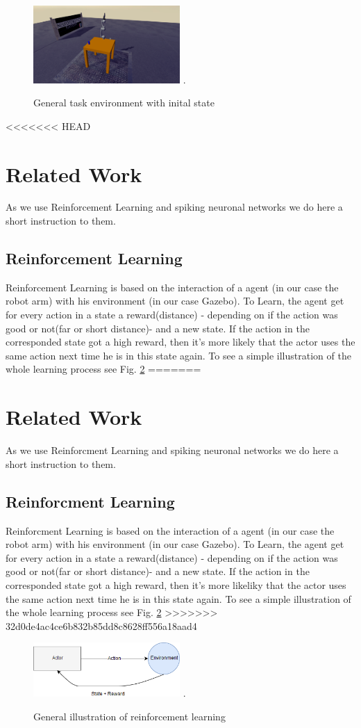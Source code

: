\begin{figure}[H]
	\centering
	\includegraphics[width=2.2in]{img/init_state.png}
	\DeclareGraphicsExtensions.
	\caption{General task environment with inital state }
	\label{init_state}
\end{figure}
<<<<<<< HEAD
\section{Related Work}
As we use Reinforcement Learning and spiking neuronal networks we do here a short instruction to them.
\subsection{Reinforcement Learning}
Reinforcement Learning is based on the interaction of a agent (in our case the robot arm) with his environment (in our case Gazebo). To Learn, the agent get for every action in a state a reward(distance) - depending on if the action was good or not(far or short distance)- and a new state. If the action in the corresponded state got a high reward, then it's more likely that the actor uses the same action next time he is in this state again. To see a simple illustration of the whole learning process see Fig. \ref{re_base}
=======

\section{Related Work}%
As we use Reinforcment Learning and spiking neuronal networks we do here a short instruction to them.
\subsection{Reinforcment Learning}%
Reinforcment Learning is based on the interaction of a agent (in our case the robot arm) with his environment (in our case Gazebo). To Learn, the agent get for every action in a state a reward(distance) - depending on if the action was good or not(far or short distance)- and a new state. If the action in the corresponded state got a high reward, then it's more likeliky that the actor uses the same action next time he is in this state again. To see a simple illustration of the whole learning process see Fig. \ref{re_base}
>>>>>>> 32d0de4ac4ce6b832b85dd8c8628ff556a18aad4
\begin{figure}[H]
	\centering
	\includegraphics[width=2.2in]{img/re_base.png}
	\DeclareGraphicsExtensions.
	\caption{General illustration of reinforcement learning}
	\label{re_base}
\end{figure}

